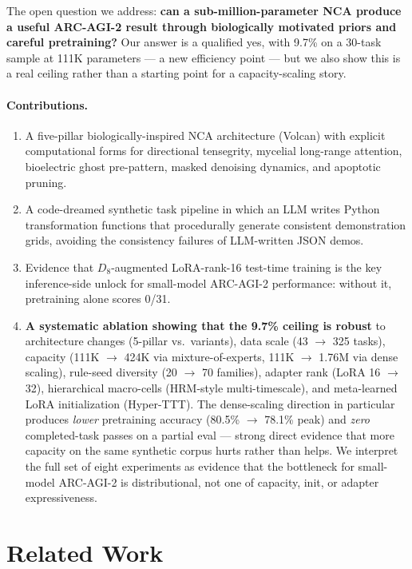 \documentclass[11pt]{article}
\begin{document}
The open question we address: \textbf{can a sub-million-parameter NCA produce a useful ARC-AGI-2 result through biologically motivated priors and careful pretraining?} Our answer is a qualified yes, with 9.7\% on a 30-task sample at 111K parameters --- a new efficiency point --- but we also show this is a real ceiling rather than a starting point for a capacity-scaling story.

\paragraph{Contributions.}
\begin{enumerate}
    \item A five-pillar biologically-inspired NCA architecture (Volcan) with explicit computational forms for directional tensegrity, mycelial long-range attention, bioelectric ghost pre-pattern, masked denoising dynamics, and apoptotic pruning.
    \item A code-dreamed synthetic task pipeline in which an LLM writes Python transformation functions that procedurally generate consistent demonstration grids, avoiding the consistency failures of LLM-written JSON demos.
    \item Evidence that $D_8$-augmented LoRA-rank-16 test-time training is the key inference-side unlock for small-model ARC-AGI-2 performance: without it, pretraining alone scores 0/31.
    \item \textbf{A systematic ablation showing that the 9.7\% ceiling is robust} to architecture changes (5-pillar vs.\ variants), data scale (43 $\rightarrow$ 325 tasks), capacity (111K $\rightarrow$ 424K via mixture-of-experts, 111K $\rightarrow$ 1.76M via dense scaling), rule-seed diversity (20 $\rightarrow$ 70 families), adapter rank (LoRA 16 $\rightarrow$ 32), hierarchical macro-cells (HRM-style multi-timescale), and meta-learned LoRA initialization (Hyper-TTT). The dense-scaling direction in particular produces \emph{lower} pretraining accuracy (80.5\% $\rightarrow$ 78.1\% peak) and \emph{zero} completed-task passes on a partial eval --- strong direct evidence that more capacity on the same synthetic corpus hurts rather than helps. We interpret the full set of eight experiments as evidence that the bottleneck for small-model ARC-AGI-2 is distributional, not one of capacity, init, or adapter expressiveness.
\end{enumerate}

\section{Related Work}
\end{document}
